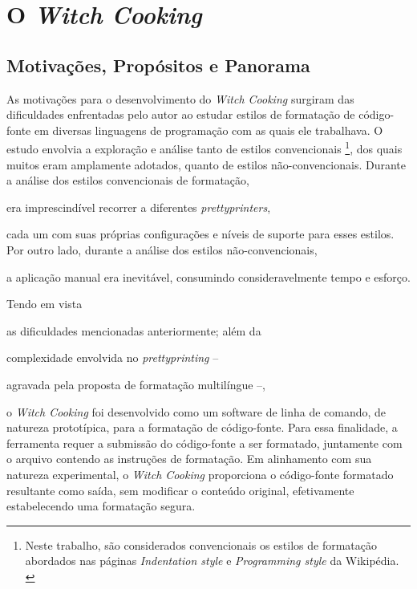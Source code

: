 \documentclass
  [11pt,a4paper,english,brazil,openright,sumario=tradicional,twoside]
  {abntex2}
\newcommand{\witchcooking}{\textit{Witch Cooking}\xspace}
\begin{document}

  \chapter{O \witchcooking}

  \section{Motivações, Propósitos e Panorama}

  As motivações para o desenvolvimento do \witchcooking surgiram das
  dificuldades enfrentadas pelo autor ao estudar estilos de formatação de
  código-fonte em diversas linguagens de programação com as quais ele
  trabalhava. O estudo envolvia a exploração e análise tanto de estilos
  convencionais%
  \footnote
    {Neste trabalho, são considerados convencionais os estilos de formatação
     abordados nas páginas \textit{Indentation style} e
     \textit{Programming style} da Wikipédia.
     \cites{wiki-2023-indentation}{wiki-2023-programming}},
  dos quais muitos eram amplamente adotados, quanto de estilos
  não-convencionais. Durante a análise dos estilos convencionais de formatação,
  \begin{inparaenum}
    \item era imprescindível recorrer a diferentes \textit{prettyprinters},
    \item cada um com suas próprias configurações e níveis de suporte para
          esses estilos. Por outro lado, durante a análise dos estilos
          não-convencionais,
    \item a aplicação manual era inevitável, consumindo consideravelmente tempo
          e esforço.
  \end{inparaenum}

  Tendo em vista
  \begin{inparaenum}
    \item as dificuldades mencionadas anteriormente; além da
    \item complexidade envolvida no \textit{prettyprinting} --
    \item agravada pela proposta de formatação multilíngue --,
  \end{inparaenum}
  o \witchcooking foi desenvolvido como um software de linha de comando, de
  natureza prototípica, para a formatação de código-fonte. Para essa finalidade,
  a ferramenta requer a submissão do código-fonte a ser formatado, juntamente
  com o arquivo contendo as instruções de formatação. Em alinhamento com sua
  natureza experimental, o \witchcooking proporciona o código-fonte formatado
  resultante como saída, sem modificar o conteúdo original, efetivamente
  estabelecendo uma formatação segura.
\end{document}
